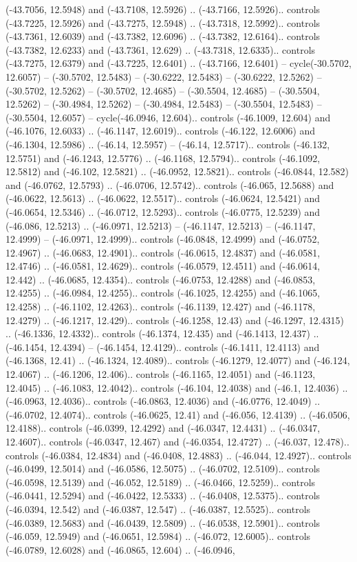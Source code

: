 \begin{scope}[shift={(2.5552, 9.9912)}]
\begin{scope}[shift={(48.1654, -14.8546)}]
(-43.7056, 12.5948) and (-43.7108, 12.5926) .. (-43.7166, 12.5926).. controls (-43.7225, 12.5926) and (-43.7275, 12.5948) .. (-43.7318, 12.5992).. controls (-43.7361, 12.6039) and (-43.7382, 12.6096) .. (-43.7382, 12.6164).. controls (-43.7382, 12.6233) and (-43.7361, 12.629) .. (-43.7318, 12.6335).. controls (-43.7275, 12.6379) and (-43.7225, 12.6401) .. (-43.7166, 12.6401) -- cycle(-30.5702, 12.6057) -- (-30.5702, 12.5483) -- (-30.6222, 12.5483) -- (-30.6222, 12.5262) -- (-30.5702, 12.5262) -- (-30.5702, 12.4685) -- (-30.5504, 12.4685) -- (-30.5504, 12.5262) -- (-30.4984, 12.5262) -- (-30.4984, 12.5483) -- (-30.5504, 12.5483) -- (-30.5504, 12.6057) -- cycle(-46.0946, 12.604).. controls (-46.1009, 12.604) and (-46.1076, 12.6033) .. (-46.1147, 12.6019).. controls (-46.122, 12.6006) and (-46.1304, 12.5986) .. (-46.14, 12.5957) -- (-46.14, 12.5717).. controls (-46.132, 12.5751) and (-46.1243, 12.5776) .. (-46.1168, 12.5794).. controls (-46.1092, 12.5812) and (-46.102, 12.5821) .. (-46.0952, 12.5821).. controls (-46.0844, 12.582) and (-46.0762, 12.5793) .. (-46.0706, 12.5742).. controls (-46.065, 12.5688) and (-46.0622, 12.5613) .. (-46.0622, 12.5517).. controls (-46.0624, 12.5421) and (-46.0654, 12.5346) .. (-46.0712, 12.5293).. controls (-46.0775, 12.5239) and (-46.086, 12.5213) .. (-46.0971, 12.5213) -- (-46.1147, 12.5213) -- (-46.1147, 12.4999) -- (-46.0971, 12.4999).. controls (-46.0848, 12.4999) and (-46.0752, 12.4967) .. (-46.0683, 12.4901).. controls (-46.0615, 12.4837) and (-46.0581, 12.4746) .. (-46.0581, 12.4629).. controls (-46.0579, 12.4511) and (-46.0614, 12.442) .. (-46.0685, 12.4354).. controls (-46.0753, 12.4288) and (-46.0853, 12.4255) .. (-46.0984, 12.4255).. controls (-46.1025, 12.4255) and (-46.1065, 12.4258) .. (-46.1102, 12.4263).. controls (-46.1139, 12.427) and (-46.1178, 12.4279) .. (-46.1217, 12.429).. controls (-46.1258, 12.43) and (-46.1297, 12.4315) .. (-46.1336, 12.4332).. controls (-46.1374, 12.435) and (-46.1413, 12.437) .. (-46.1454, 12.4394) -- (-46.1454, 12.4129).. controls (-46.1411, 12.4113) and (-46.1368, 12.41) .. (-46.1324, 12.4089).. controls (-46.1279, 12.4077) and (-46.124, 12.4067) .. (-46.1206, 12.406).. controls (-46.1165, 12.4051) and (-46.1123, 12.4045) .. (-46.1083, 12.4042).. controls (-46.104, 12.4038) and (-46.1, 12.4036) .. (-46.0963, 12.4036).. controls (-46.0863, 12.4036) and (-46.0776, 12.4049) .. (-46.0702, 12.4074).. controls (-46.0625, 12.41) and (-46.056, 12.4139) .. (-46.0506, 12.4188).. controls (-46.0399, 12.4292) and (-46.0347, 12.4431) .. (-46.0347, 12.4607).. controls (-46.0347, 12.467) and (-46.0354, 12.4727) .. (-46.037, 12.478).. controls (-46.0384, 12.4834) and (-46.0408, 12.4883) .. (-46.044, 12.4927).. controls (-46.0499, 12.5014) and (-46.0586, 12.5075) .. (-46.0702, 12.5109).. controls (-46.0598, 12.5139) and (-46.052, 12.5189) .. (-46.0466, 12.5259).. controls (-46.0441, 12.5294) and (-46.0422, 12.5333) .. (-46.0408, 12.5375).. controls (-46.0394, 12.542) and (-46.0387, 12.547) .. (-46.0387, 12.5525).. controls (-46.0389, 12.5683) and (-46.0439, 12.5809) .. (-46.0538, 12.5901).. controls (-46.059, 12.5949) and (-46.0651, 12.5984) .. (-46.072, 12.6005).. controls (-46.0789, 12.6028) and (-46.0865, 12.604) .. (-46.0946, 
\end{scope}
\end{scope}
